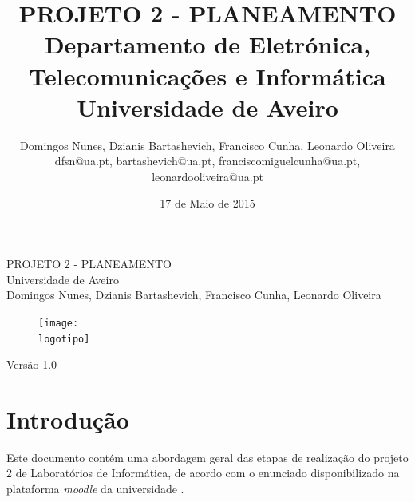 \documentclass{report}
\begin{document}
%
\def\titulo{PROJETO 2 - PLANEAMENTO}
\def\data{17 de Maio de 2015}
\def\autores{Domingos Nunes, Dzianis Bartashevich, Francisco Cunha, Leonardo Oliveira}
\def\autorescontactos{dfsn@ua.pt, bartashevich@ua.pt, franciscomiguelcunha@ua.pt, leonardooliveira@ua.pt}
\def\versao{Versão 1.0}
\def\departamento{Departamento de Eletrónica, Telecomunicações e Informática}
\def\empresa{Universidade de Aveiro}
\def\logotipo{images/ua.pdf}
%
%
\begin{titlepage}

\begin{center}
%
\vspace*{50mm}
%
{\Huge \titulo}\\ 
%
\vspace{10mm}
%
{\Large \empresa}\\
%
\vspace{10mm}
%
{\LARGE \autores}\\ 
%
%
\vspace{30mm}
%
\begin{figure}[h]
\center
\texttt{[image: \\logotipo]}
\end{figure}
%
\vspace{20mm}
\end{center}
%
\begin{flushright}
\versao
\end{flushright}
\end{titlepage}

%
%
%
%
\title{%
{\Huge\textbf{\titulo}}\\
{\Large \departamento\\ \empresa}
}
%
\author{%
    \autores \\
    \autorescontactos
}
%
\date{\data}
%
\maketitle
%
%



\tableofcontents
\listoffigures


\clearpage
{}

\chapter{Introdução}
\label{chap.introducao}
Este documento contém uma abordagem geral das etapas de realização do projeto 2 de Laboratórios de Informática, de acordo com o enunciado disponibilizado na plataforma \textit{moodle} da universidade \cite{moodle}.
\end{document}
